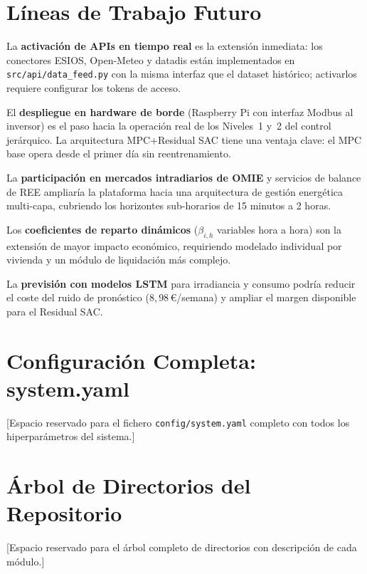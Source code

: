 \documentclass[12pt, a4paper, twoside]{report}
\begin{document}
\chapter{Líneas de Trabajo Futuro}
\label{chap:futuro}

La \textbf{activación de APIs en tiempo real} es la extensión inmediata: los
conectores ESIOS, Open-Meteo y datadis están implementados en
\texttt{src/api/data\_feed.py} con la misma interfaz que el dataset histórico;
activarlos requiere configurar los tokens de acceso.

El \textbf{despliegue en hardware de borde} (Raspberry Pi con interfaz Modbus
al inversor) es el paso hacia la operación real de los Niveles~1 y~2 del
control jerárquico. La arquitectura MPC+Residual SAC tiene una ventaja clave:
el MPC base opera desde el primer día sin reentrenamiento.

La \textbf{participación en mercados intradiarios de OMIE} y servicios de
balance de REE ampliaría la plataforma hacia una arquitectura de gestión
energética multi-capa, cubriendo los horizontes sub-horarios de 15 minutos a
2 horas.

Los \textbf{coeficientes de reparto dinámicos} ($\beta_{i,h}$ variables hora
a hora) son la extensión de mayor impacto económico, requiriendo modelado
individual por vivienda y un módulo de liquidación más complejo.

La \textbf{previsión con modelos LSTM} para irradiancia y consumo podría
reducir el coste del ruido de pronóstico ($8{,}98$\,€/semana) y ampliar el
margen disponible para el Residual SAC.



\appendix

\chapter{Configuración Completa: system.yaml}
\label{app:config}
[Espacio reservado para el fichero \texttt{config/system.yaml} completo con
todos los hiperparámetros del sistema.]

\chapter{Árbol de Directorios del Repositorio}
\label{app:estructura}
[Espacio reservado para el árbol completo de directorios con descripción de
cada módulo.]
\end{document}
